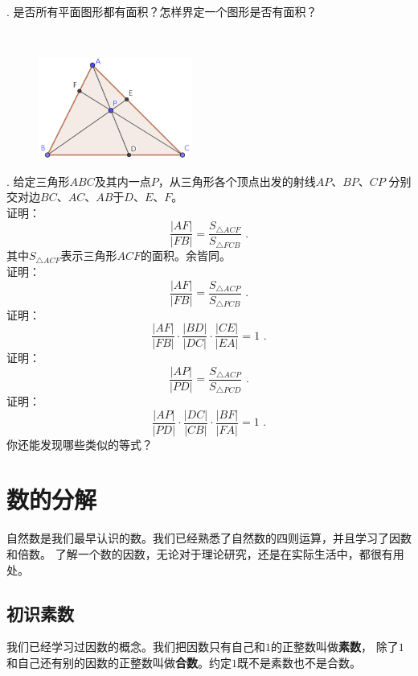 \documentclass[12pt,UTF8]{ctexbook}
\begin{document}
\begin{sk}
    \mbox{} \\
    . 是否所有平面图形都有面积？怎样界定一个图形是否有面积？
\end{sk}

\begin{xt}
    \mbox{} \\

    \begin{figure}[H] 
        \vspace{4pt}
        \centering
        \includegraphics[width=0.45\textwidth]{tu/塞瓦定理1.png}
    \end{figure}

    . 给定三角形$ABC$及其内一点$P$，从三角形各个顶点出发的射线$AP$、$BP$、$CP$
    分别交对边$BC$、$AC$、$AB$于$D$、$E$、$F$。\\
     证明：
    $$ \frac{|AF|}{|FB|} = \frac{S_{\triangle ACF}}{S_{\triangle FCB}}\,\,.$$
    \indent 其中$S_{\triangle ACF}$表示三角形$ACF$的面积。余皆同。\\
     证明：
    $$ \frac{|AF|}{|FB|} = \frac{S_{\triangle ACP}}{S_{\triangle PCB}}\,\,.$$
     证明：
    $$ \frac{|AF|}{|FB|} \cdot \frac{|BD|}{|DC|} \cdot \frac{|CE|}{|EA|} = 1\,\,.$$
     证明：
    $$ \frac{|AP|}{|PD|} = \frac{S_{\triangle ACP}}{S_{\triangle PCD}}\,\,.$$
     证明：
    $$ \frac{|AP|}{|PD|} \cdot \frac{|DC|}{|CB|} \cdot \frac{|BF|}{|FA|} = 1\,\,.$$
     你还能发现哪些类似的等式？
\end{xt}


\chapter{数的分解}
自然数是我们最早认识的数。我们已经熟悉了自然数的四则运算，并且学习了因数和倍数。
了解一个数的因数，无论对于理论研究，还是在实际生活中，都很有用处。
\section{初识素数}
我们已经学习过因数的概念。我们把因数只有自己和$1$的正整数叫做\textbf{素数}，
除了$1$和自己还有别的因数的正整数叫做\textbf{合数}。约定$1$既不是素数也不是合数。
\end{document}
